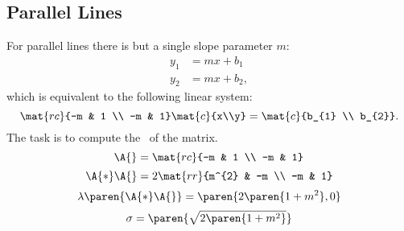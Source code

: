 \subsection{Parallel Lines}  %
For parallel lines there is but a single slope parameter $m$:
  \begin{equation*}   %
    \begin{split}
      y_{1} &= mx + b_{1} \\
      y_{2} &= mx + b_{2},
    \end{split}
  \end{equation*}
which is equivalent to the following linear system:
  \begin{equation}   %
    \mat{rc}{-m & 1 \\ -m & 1} \mat{c}{x\\y} = \mat{c}{b_{1} \\ b_{2}}.
    \label{eq:parallel lines}
  \end{equation}
The task is to compute the \asvd \ of the matrix.
  \begin{equation*}   %
    \A{} = \mat{rc}{-m & 1 \\ -m & 1}
  \end{equation*}
%
  \begin{equation*}   %
    \A{*}\A{} = 2 \mat{rr}{m^{2} & -m \\ -m & 1}
  \end{equation*}
%
  \begin{equation*}   %
    \lambda \paren{\A{*}\A{}} = \paren{2\paren{1+m^{2}},0}
  \end{equation*}
%
%
  \begin{equation*}   %
  	\sigma = \paren{\sqrt{2\paren{1+m^{2}}}}
  \end{equation*}

